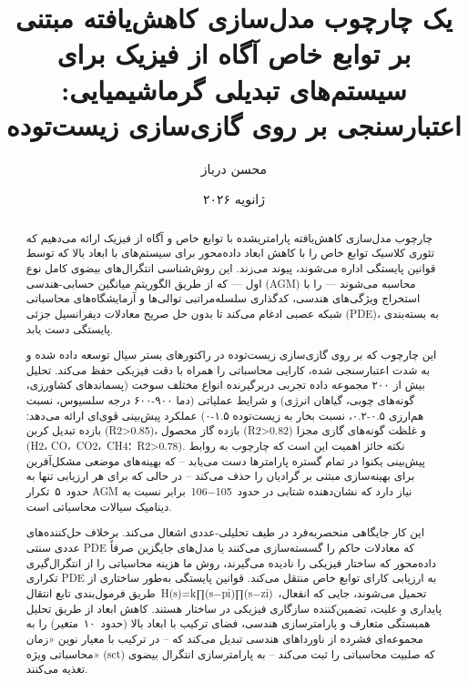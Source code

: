 \documentclass[12pt, a4paper]{article}
\begin{document}
\title{یک چارچوب مدل‌سازی کاهش‌یافته مبتنی بر توابع خاص آگاه از فیزیک برای سیستم‌های تبدیلی گرماشیمیایی: اعتبارسنجی بر روی گازی‌سازی زیست‌توده}
\author{محسن درباز}
\date{ژانویه ۲۰۲۶}

\maketitle

\begin{abstract}
چارچوب مدل‌سازی کاهش‌یافته پارامتریشده با توابع خاص و آگاه از فیزیک ارائه می‌دهیم که تئوری کلاسیک توابع خاص را با کاهش ابعاد داده‌محور برای سیستم‌های با ابعاد بالا که توسط قوانین پایستگی اداره می‌شوند، پیوند می‌زند. این روش‌شناسی انتگرال‌های بیضوی کامل نوع اول — که از طریق الگوریتم میانگین حسابی-هندسی (AGM) محاسبه می‌شوند — را با استخراج ویژگی‌های هندسی، کدگذاری سلسله‌مراتبی توالی‌ها و آزمایشگاه‌های محاسباتی شبکه عصبی ادغام می‌کند تا بدون حل صریح معادلات دیفرانسیل جزئی (PDE)، به بسته‌بندی پایستگی دست یابد.

این چارچوب که بر روی گازی‌سازی زیست‌توده در راکتورهای بستر سیال توسعه داده شده و به شدت اعتبارسنجی شده، کارایی محاسباتی را همراه با دقت فیزیکی حفظ می‌کند. تحلیل بیش از ۲۰۰ مجموعه داده تجربی دربرگیرنده انواع مختلف سوخت (پسماندهای کشاورزی، گونه‌های چوبی، گیاهان انرژی) و شرایط عملیاتی (دما ۹۰۰-۶۰۰ درجه سلسیوس، نسبت هم‌ارزی ۰.۵-۰.۲، نسبت بخار به زیست‌توده ۱.۵-۰) عملکرد پیش‌بینی قوی‌ای ارائه می‌دهد: بازده تبدیل کربن (R2>0.85)، بازده گاز محصول (R2>0.82) و غلظت گونه‌های گازی مجزا (H2، CO، CO2، CH4؛ R2>0.78). نکته حائز اهمیت این است که چارچوب به روابط پیش‌بینی یکنوا در تمام گستره پارامترها دست می‌یابد – که بهینه‌های موضعی مشکل‌آفرین برای بهینه‌سازی مبتنی بر گرادیان را حذف می‌کند – در حالی که برای هر ارزیابی تنها به حدود ۵ تکرار AGM نیاز دارد که نشان‌دهنده شتابی در حدود 105−106 برابر نسبت به دینامیک سیالات محاسباتی است.

این کار جایگاهی منحصربه‌فرد در طیف تحلیلی-عددی اشغال می‌کند. برخلاف حل‌کننده‌های عددی سنتی PDE که معادلات حاکم را گسسته‌سازی می‌کنند یا مدل‌های جایگزین صرفاً داده‌محور که ساختار فیزیکی را نادیده می‌گیرند، روش ما هزینه محاسباتی را از انتگرال‌گیری تکراری PDE به ارزیابی کارای توابع خاص منتقل می‌کند. قوانین پایستگی به‌طور ساختاری از طریق فرمول‌بندی تابع انتقال H(s)=k∏(s−pi)∏(s−zi) تحمیل می‌شوند، جایی که انفعال، پایداری و علیت، تضمین‌کننده سازگاری فیزیکی در ساختار هستند. کاهش ابعاد از طریق تحلیل همبستگی متعارف و پارامترسازی هندسی، فضای ترکیب با ابعاد بالا (حدود ۱۰ متغیر) را به مجموعه‌ای فشرده از ناورداهای هندسی تبدیل می‌کند که – در ترکیب با معیار نوین «زمان محاسباتی ویژه» (sct) که صلبیت محاسباتی را ثبت می‌کند – به پارامترسازی انتگرال بیضوی تغذیه می‌کنند.


\end{abstract}
\end{document}
